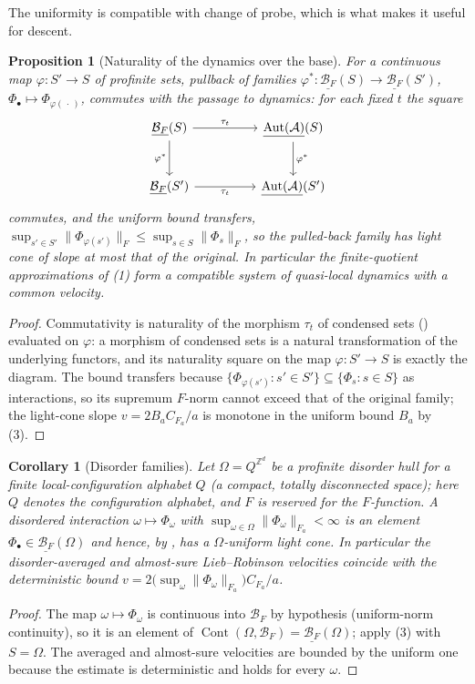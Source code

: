 \documentclass[12pt]{article}
\newcommand{\cond}[1]{\underline{#1}}          %
\newcommand{\Cont}{\operatorname{Cont}}        %
\newcommand{\Ffun}{F}                          %
\newcommand{\BF}{\mathcal{B}_{F}}              %
\newcommand{\dis}{\Omega}                       %
\newcommand{\qA}{\mathcal{A}}
\newcommand{\Aut}{\operatorname{Aut}}
\newcommand{\Fnorm}[1]{\lVert #1\rVert_{F}}
\newcommand{\Fanorm}[1]{\lVert #1\rVert_{F_a}}
\newcommand{\Z}{\mathbb{Z}}
\newtheorem{proposition}[theorem]{Proposition}
\newtheorem{corollary}[theorem]{Corollary}
\theoremstyle{definition}
\theoremstyle{remark}
\begin{document}
The uniformity is compatible with change of probe, which is what makes it useful for descent.

\begin{proposition}[Naturality of the dynamics over the base]
\label{prop:naturality}
For a continuous map $\varphi:S'\to S$ of profinite sets, pullback of families
$\varphi^*:\cond{\BF}(S)\to\cond{\BF}(S')$, $\Phi_\bullet\mapsto\Phi_{\varphi(\,\cdot\,)}$,
commutes with the passage to dynamics: for each fixed $t$ the square
\[
\begin{tikzcd}[column sep=huge, row sep=large]
  \cond{\BF}(S) \arrow[r, "\tau_t"] \arrow[d, "\varphi^*"'] & \cond{\Aut(\qA)}(S) \arrow[d, "\varphi^*"] \\
  \cond{\BF}(S') \arrow[r, "\tau_t"'] & \cond{\Aut(\qA)}(S')
\end{tikzcd}
\]
commutes, and the uniform bound transfers, $\sup_{s'\in S'}\Fnorm{\Phi_{\varphi(s')}}
\le\sup_{s\in S}\Fnorm{\Phi_s}$, so the pulled-back family has light cone of slope at most that
of the original. In particular the finite-quotient approximations of (1)
form a compatible system of quasi-local dynamics with a common velocity.
\end{proposition}
\begin{proof}
Commutativity is naturality of the morphism $\tau_t$ of condensed sets
() evaluated on $\varphi$: a morphism of condensed sets is a
natural transformation of the underlying functors, and its naturality square on the map
$\varphi:S'\to S$ is exactly the diagram. The bound transfers because
$\{\Phi_{\varphi(s')}:s'\in S'\}\subseteq\{\Phi_s:s\in S\}$ as interactions, so its supremum
$\Ffun$-norm cannot exceed that of the original family; the light-cone slope $v=2B_aC_{\Ffun_a}
/a$ is monotone in the uniform bound $B_a$ by (3).
\end{proof}

\begin{corollary}[Disorder families]
\label{cor:disorder}
Let $\dis=Q^{\Z^d}$ be a profinite disorder hull for a finite local-configuration alphabet
$Q$ (a compact, totally disconnected space); here $Q$ denotes the configuration alphabet, and
$\Ffun$ is reserved for the $\Ffun$-function.
A disordered interaction $\omega\mapsto\Phi_\omega$ with
$\sup_{\omega\in\dis}\Fanorm{\Phi_\omega}<\infty$ is an element $\Phi_\bullet\in\cond{\BF}(\dis)$
and hence, by , has a $\dis$-uniform light cone. In particular the
disorder-averaged and almost-sure Lieb--Robinson velocities coincide with the deterministic
bound $v=2\bigl(\sup_\omega\Fanorm{\Phi_\omega}\bigr)C_{\Ffun_a}/a$.
\end{corollary}
\begin{proof}
The map $\omega\mapsto\Phi_\omega$ is continuous into $\BF$ by hypothesis (uniform-norm
continuity), so it is an element of $\Cont(\dis,\BF)=\cond{\BF}(\dis)$; apply
(3) with $S=\dis$. The averaged and almost-sure velocities are bounded by
the uniform one because the estimate is deterministic and holds for every $\omega$.
\end{proof}
\end{document}
